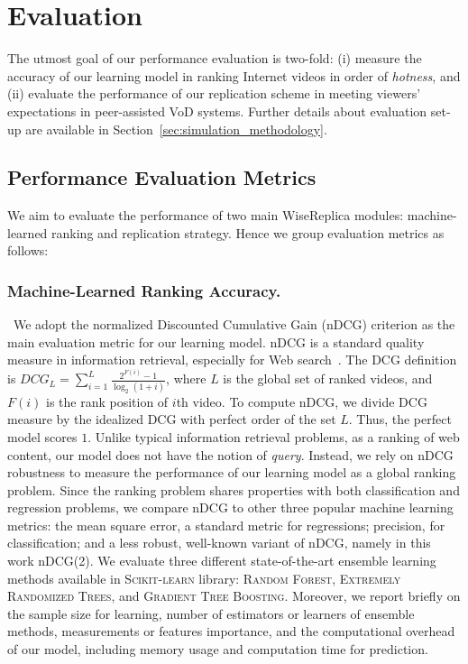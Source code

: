 \section{Evaluation}
\label{sec:evaluation}

The utmost goal of our performance evaluation is two-fold: (i) measure the accuracy of our learning model in ranking Internet videos in order of \emph{hotness}, and (ii) evaluate the performance of our replication scheme in meeting viewers' expectations in peer-assisted VoD systems. Further details about evaluation set-up are available in Section~\ref{sec:simulation_methodology}.

\subsection{Performance Evaluation Metrics}
\label{subsec:methodology_metrics}

We aim to evaluate the performance of two main WiseReplica modules: machine-learned ranking and replication strategy. Hence we group evaluation metrics as follows:

\subsubsection{Machine-Learned Ranking Accuracy.} 

\ We adopt the normalized Discounted Cumulative Gain (nDCG) criterion as the main evaluation metric for our learning model. nDCG is a standard quality measure in information retrieval, especially for Web search~\cite{jarvelin2002cumulated}. The DCG definition is $DCG_{L}=\sum_{i=1}^L \frac{2^{F(i)}-1}{\log_{2}(1+i)}$, where $L$ is the global set of ranked videos, and $F(i)$ is the rank position of $i$th video. To compute nDCG, we divide DCG measure by the idealized DCG with perfect order of the set $L$. Thus, the perfect model scores $1$. Unlike typical information retrieval problems, as a ranking of web content, our model does not have the notion of \emph{query}. Instead, we rely on nDCG robustness to measure the performance of our learning model as a global ranking problem. Since the ranking problem shares properties with both classification and regression problems, we compare nDCG to other three popular machine learning metrics: the mean square error, a standard metric for regressions; precision, for classification; and a less robust, well-known variant of nDCG, namely  in this work nDCG(2). We evaluate three different state-of-the-art ensemble learning methods available in \textsc{Scikit-learn} library: \textsc{Random Forest}, \textsc{Extremely Randomized Trees}, and \textsc{Gradient Tree Boosting}. Moreover, we report briefly on the sample size for learning, number of estimators or learners of ensemble methods, measurements or features importance, and the computational overhead of our model, including memory usage and computation time for prediction.

